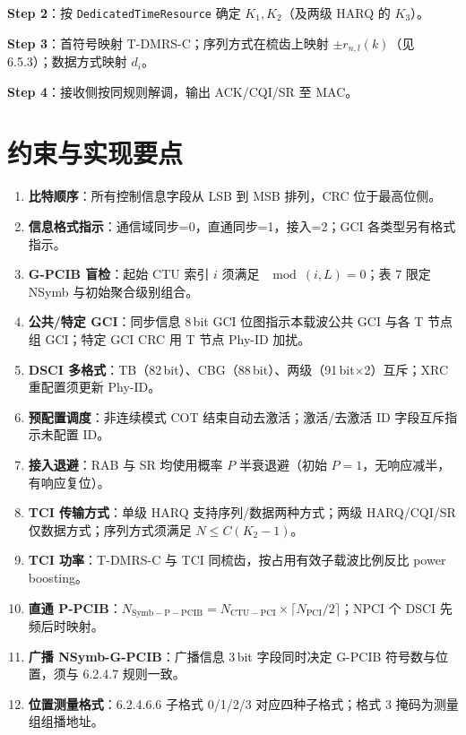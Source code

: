 \documentclass[11pt,a4paper]{ctexart}
\begin{document}
\textbf{Step 2}：按 \texttt{DedicatedTimeResource} 确定 $K_1,K_2$（及两级 HARQ 的 $K_3$）。

\textbf{Step 3}：首符号映射 T-DMRS-C；序列方式在梳齿上映射 $\pm r_{n,l}(k)$（见 6.5.3）；数据方式映射 $d_i$。

\textbf{Step 4}：接收侧按同规则解调，输出 ACK/CQI/SR 至 MAC。

\section{约束与实现要点}

\begin{enumerate}[nosep]
  \item \textbf{比特顺序}：所有控制信息字段从 LSB 到 MSB 排列，CRC 位于最高位侧。
  \item \textbf{信息格式指示}：通信域同步=0，直通同步=1，接入=2；GCI 各类型另有格式指示。
  \item \textbf{G-PCIB 盲检}：起始 CTU 索引 $i$ 须满足 $\mod(i,L)=0$；表 7 限定 NSymb 与初始聚合级别组合。
  \item \textbf{公共/特定 GCI}：同步信息 8\,bit GCI 位图指示本载波公共 GCI 与各 T 节点组 GCI；特定 GCI CRC 用 T 节点 Phy-ID 加扰。
  \item \textbf{DSCI 多格式}：TB（82\,bit）、CBG（88\,bit）、两级（91\,bit$\times$2）互斥；XRC 重配置须更新 Phy-ID。
  \item \textbf{预配置调度}：非连续模式 COT 结束自动去激活；激活/去激活 ID 字段互斥指示未配置 ID。
  \item \textbf{接入退避}：RAB 与 SR 均使用概率 $P$ 半衰退避（初始 $P=1$，无响应减半，有响应复位）。
  \item \textbf{TCI 传输方式}：单级 HARQ 支持序列/数据两种方式；两级 HARQ/CQI/SR 仅数据方式；序列方式须满足 $N \leq C(K_2-1)$。
  \item \textbf{TCI 功率}：T-DMRS-C 与 TCI 同梳齿，按占用有效子载波比例反比 power boosting。
  \item \textbf{直通 P-PCIB}：$N_{\mathrm{Symb-P-PCIB}} = N_{\mathrm{CTU-PCI}} \times \lceil N_{\mathrm{PCI}}/2 \rceil$；NPCI 个 DSCI 先频后时映射。
  \item \textbf{广播 NSymb-G-PCIB}：广播信息 3\,bit 字段同时决定 G-PCIB 符号数与位置，须与 6.2.4.7 规则一致。
  \item \textbf{位置测量格式}：6.2.4.6.6 子格式 0/1/2/3 对应四种子格式；格式 3 掩码为测量组组播地址。
\end{enumerate}
\end{document}
